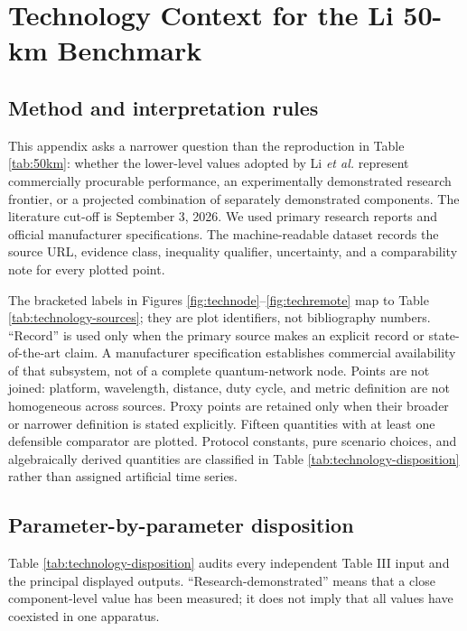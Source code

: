 \documentclass[10pt]{article}
\begin{document}
\appendix
\section{Technology Context for the Li 50-km Benchmark}
\label{app:technology-context}

\subsection{Method and interpretation rules}

This appendix asks a narrower question than the reproduction in Table
\ref{tab:50km}: whether the lower-level values adopted by Li \emph{et al.}
represent commercially procurable performance, an experimentally demonstrated
research frontier, or a projected combination of separately demonstrated
components.  The literature cut-off is September 3, 2026.  We used primary
research reports and official manufacturer specifications.  The machine-readable
dataset records the source URL, evidence class, inequality qualifier, uncertainty,
and a comparability note for every plotted point.

The bracketed labels in Figures \ref{fig:technode}--\ref{fig:techremote} map to
Table \ref{tab:technology-sources}; they are plot identifiers, not bibliography
numbers.  ``Record'' is used only when the primary source makes an explicit
record or state-of-the-art claim.  A manufacturer specification establishes
commercial availability of that subsystem, not of a complete quantum-network
node.  Points are not joined: platform, wavelength, distance, duty cycle, and
metric definition are not homogeneous across sources.  Proxy points are
retained only when their broader or narrower definition is stated explicitly.
Fifteen quantities with at least one defensible comparator are plotted.
Protocol constants, pure scenario choices, and algebraically derived quantities
are classified in Table \ref{tab:technology-disposition} rather than assigned
artificial time series.

\subsection{Parameter-by-parameter disposition}

Table \ref{tab:technology-disposition} audits every independent Table III input
and the principal displayed outputs.  ``Research-demonstrated'' means that a
close component-level value has been measured; it does not imply that all
values have coexisted in one apparatus.
\end{document}
